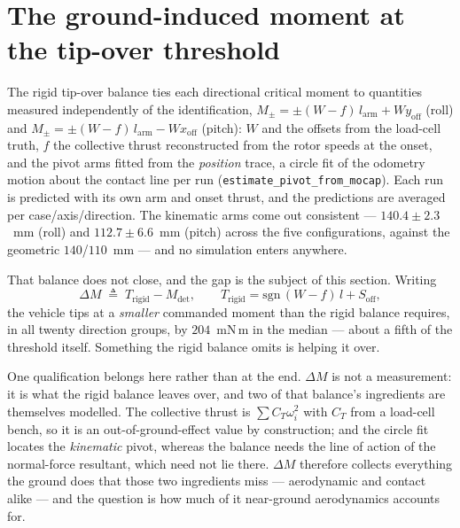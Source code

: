 \documentclass[10pt]{article}
\begin{document}
\section{The ground-induced moment at the tip-over threshold}
\label{sec:static}

The rigid tip-over balance ties each directional critical moment to
quantities measured independently of the identification,
$M_{\pm} = \pm(W - f)\,l_{\mathrm{arm}} + W y_{\mathrm{off}}$ (roll)
and $M_{\pm} = \pm(W - f)\,l_{\mathrm{arm}} - W x_{\mathrm{off}}$
(pitch): $W$ and the offsets from the load-cell truth, $f$ the
collective thrust reconstructed from the rotor speeds at the onset,
and the pivot arms fitted from the \emph{position} trace, a circle fit
of the odometry motion about the contact line per run
(\texttt{estimate\_pivot\_from\_mocap}). Each run is predicted with
its own arm and onset thrust, and the predictions are averaged per
case/axis/direction. The kinematic arms come out consistent ---
$140.4 \pm 2.3$~mm (roll) and $112.7 \pm 6.6$~mm (pitch) across the
five configurations, against the geometric $140$/$110$~mm --- and no
simulation enters anywhere.

That balance does not close, and the gap is the subject of this
section. Writing
\begin{equation}
\Delta M \;\triangleq\; T_{\mathrm{rigid}} - M_{\mathrm{det}},
\qquad T_{\mathrm{rigid}} = \mathrm{sgn}\,(W - f)\,l + S_{\mathrm{off}} ,
\label{eq:gap}
\end{equation}
the vehicle tips at a \emph{smaller} commanded moment than the rigid
balance requires, in all twenty direction groups, by $204$~mN\,m in
the median --- about a fifth of the threshold itself. Something the
rigid balance omits is helping it over.

One qualification belongs here rather than at the end. $\Delta M$ is
not a measurement: it is what the rigid balance leaves over, and two
of that balance's ingredients are themselves modelled. The collective
thrust is $\sum C_T\omega_i^2$ with $C_T$ from a load-cell bench, so
it is an out-of-ground-effect value by construction; and the circle
fit locates the \emph{kinematic} pivot, whereas the balance needs the
line of action of the normal-force resultant, which need not lie
there. $\Delta M$ therefore collects everything the ground does that
those two ingredients miss --- aerodynamic and contact alike --- and
the question is how much of it near-ground aerodynamics accounts for.
\end{document}
